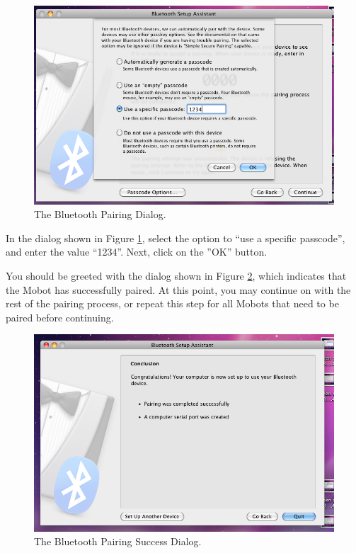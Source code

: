\documentclass{article}
\begin{document}
\begin{figure}[H]
\begin{center}
\includegraphics[width=5in]{images/mac_pairing5.png}
\end{center}
\caption{\label{fig:mac_pairing5} The Bluetooth Pairing Dialog.}
\end{figure}

In the dialog shown in Figure \ref{fig:mac_pairing5}, select the option to 
``use a specific passcode'', and enter the value ``1234''. Next, 
click on the ''OK'' button.

You should be greeted with the dialog shown in Figure \ref{fig:mac_pairing6}, which indicates that the Mobot
has successfully paired. At this point, you may continue on with the rest of the pairing process, or 
repeat this step for all Mobots that need to be paired before continuing.

\begin{figure}[H]
\begin{center}
\includegraphics[width=5in]{images/mac_pairing6.png}
\end{center}
\caption{\label{fig:mac_pairing6} The Bluetooth Pairing Success Dialog.}
\end{figure}
\end{document}
